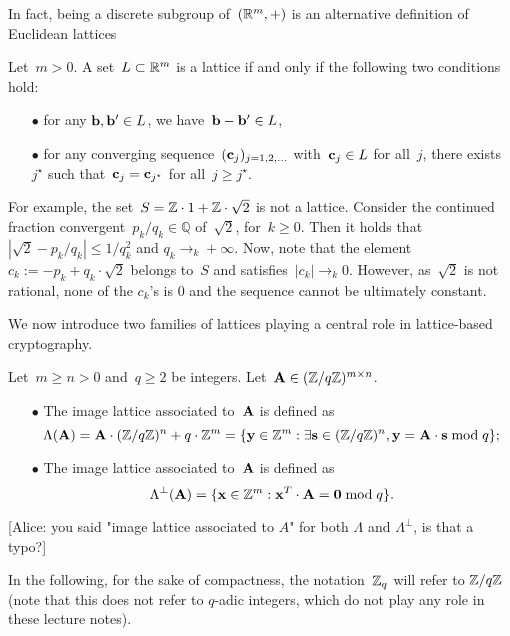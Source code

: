 In fact, being a discrete subgroup of~$(\mathbb{R}^m,+)$ is an alternative definition of Euclidean lattices

\begin{lemma}
\label{def:lattice2}
Let~$m >0$. A set~$L \subset \mathbb{R}^m$ is a lattice if and only if the following two conditions hold:
\begin{itemize}
\item[$\bullet$] for any ${\bf b}, {\bf b}' \in L$, we have~${\bf b} - {\bf b}' \in L$,
\item[$\bullet$] for any converging sequence~$({\bf c}_j)_{j=1,2,\ldots}$ with~${\bf c}_j \in L$ for all~$j$, there exists~$j^\star$ such that~${\bf c}_j = {\bf c}_{j^\star}$ for all~$j \geq j^\star$. 
\end{itemize}
\end{lemma}

For example, the set~$S= \mathbb{Z} \cdot 1 + \mathbb{Z} \cdot \sqrt{2}$ is not a lattice. Consider the continued fraction convergent~$p_k/q_k \in \mathbb{Q}$ of~$\sqrt{2}$, for~$k \geq 0$. Then it holds that~$|\sqrt{2} - p_k /q_k| \leq 1/q_k^2$ and $q_k \rightarrow_k +\infty$. Now, note that the element~$c_k := -p_k + q_k \cdot  \sqrt{2}$ belongs to~$S$ and satisfies~$|c_k| \rightarrow_k 0$. However, as~$\sqrt{2}$ is not rational, none of the $c_k$'s is $0$ and the sequence cannot be ultimately constant.

We now introduce two families of lattices playing a central role in lattice-based cryptography.

\begin{definition}
\label{def:qary}
Let~$m \geq n >0$ and~$q \geq 2$ be integers. Let~${\bf A} \in (\mathbb{Z}/q\mathbb{Z})^{m \times n}$. 
\begin{itemize} 
\item[$\bullet$] The image lattice associated to~${\bf A}$ is defined as
\[
\Lambda({\bf A}) = {\bf A} \cdot (\mathbb{Z}/q\mathbb{Z})^n + q \cdot \mathbb{Z}^m = \{ {\bf y} \in \mathbb{Z}^m: \exists {\bf s} \in (\mathbb{Z}/q\mathbb{Z})^n, {\bf y} = {\bf A}\cdot {\bf s} \bmod q\};
\]
\item[$\bullet$] The image lattice associated to~${\bf A}$ is defined as
\[
\Lambda^\perp({\bf A}) = \{ {\bf x} \in \mathbb{Z}^m: {\bf x}^T \cdot {\bf A} = {\bf 0} \bmod q\}.
\]
\end{itemize}
\end{definition}
{\color{red} [Alice: you said "image lattice associated to $A$" for both $\Lambda$ and $\Lambda^\perp$, is that a typo?]}

In the following, for the sake of compactness, the notation~$\mathbb{Z}_q$ will refer to $\mathbb{Z}/q\mathbb{Z}$ (note that this does not refer 
to $q$-adic integers, which do not play any role in these lecture notes). 

